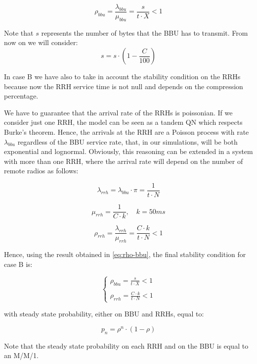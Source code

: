 \documentclass[11pt,a4paper,oneside, openright]{article}
\begin{document}
\begin{equation} \label{eq:rho-bbu}
\rho_{bbu} = \frac{\lambda_{bbu}}{\mu_{bbu}} = \frac{s}{t \cdot X} < 1
\end{equation}

Note that $s$ represents the number of bytes that the BBU has to transmit. From now on we will consider:
$$s = s\cdot(1-\frac{C}{100})$$

In case B we have also to take in account the stability condition on the RRHs because now the RRH service time is not null and depends on the compression percentage. 

We have to guarantee that the arrival rate of the RRHs is poissonian. If we consider just one RRH, the model can be seen as a tandem QN which respects Burke's theorem. Hence, the arrivals at the RRH are a Poisson process with rate $ \lambda_{bbu} $ regardless of the BBU service rate, that, in our simulations, will be both exponential and lognormal. 
Obviously, this reasoning can be extended in a system with more than one RRH, where the arrival rate will depend on the number of remote radios as follows:

$$ \lambda_{rrh} = \lambda_{bbu} \cdot \pi = \frac{1}{t \cdot N} $$

$$ \mu_{rrh} = \frac{1}{C \cdot k}, \quad k = 50ms $$

\begin{equation} \label{eq:rho-rrh}
\rho_{rrh} = \frac{\lambda_{rrh}}{\mu_{rrh}} = \frac{C \cdot k}{t \cdot N} < 1
\end{equation}

Hence, using the result obtained in \eqref{eq:rho-bbu}, the final stability condition for case B is:

$$ \begin{cases} \rho_{bbu} = \frac{s}{t \cdot X} < 1 \\ \\ \rho_{rrh} = \frac{C \cdot k}{t \cdot N} < 1 \end{cases} $$

with steady state probability, either on BBU and RRHs, equal to:

$$ p_{n} = \rho^n \cdot (1 - \rho) $$

Note that the steady state probability on each RRH and on the BBU is equal to an M/M/1.

\end{document}
